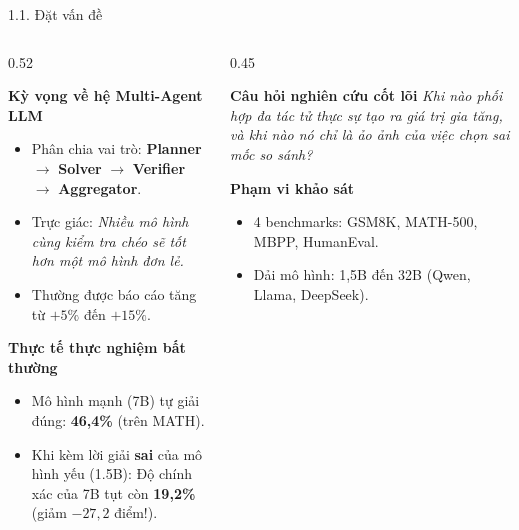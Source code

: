 \documentclass[aspectratio=169,10pt]{beamer}
\begin{document}
\begin{frame}{1.1. Đặt vấn đề}
  \begin{columns}[c]
    \begin{column}{0.52\textwidth}
      \begin{block}{\textbf{Kỳ vọng về hệ Multi-Agent LLM}}
        \begin{itemize}\small
          \item Phân chia vai trò: \textbf{Planner} $\to$ \textbf{Solver} $\to$ \textbf{Verifier} $\to$ \textbf{Aggregator}.
          \item Trực giác: \emph{Nhiều mô hình cùng kiểm tra chéo sẽ tốt hơn một mô hình đơn lẻ.}
          \item Thường được báo cáo tăng từ $+5\%$ đến $+15\%$.
        \end{itemize}
      \end{block}
      
      \begin{alertblock}{\textbf{Thực tế thực nghiệm bất thường}}
        \begin{itemize}\small
          \item Mô hình mạnh (7B) tự giải đúng: \textbf{46,4\%} (trên MATH).
          \item Khi kèm lời giải \textbf{sai} của mô hình yếu (1.5B): Độ chính xác của 7B tụt còn \textbf{19,2\%} (giảm $-27{,}2$ điểm!).
        \end{itemize}
      \end{alertblock}
    \end{column}
    
    \begin{column}{0.45\textwidth}
      \begin{exampleblock}{\textbf{Câu hỏi nghiên cứu cốt lõi}}
        \centering\vspace{6pt}
        \textit{Khi nào phối hợp đa tác tử thực sự tạo ra giá trị gia tăng, và khi nào nó chỉ là ảo ảnh của việc chọn sai mốc so sánh?}
        \vspace{6pt}
      \end{exampleblock}
      
      \begin{block}{\textbf{Phạm vi khảo sát}}
        \begin{itemize}\footnotesize
          \item 4 benchmarks: GSM8K, MATH-500, MBPP, HumanEval.
          \item Dải mô hình: 1,5B đến 32B (Qwen, Llama, DeepSeek).
        \end{itemize}
      \end{block}
    \end{column}
  \end{columns}
\end{frame}
\end{document}
